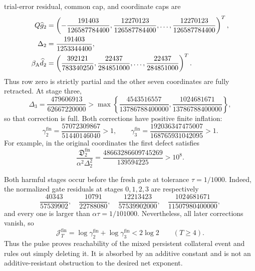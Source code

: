 \begin{proposition}
trial-error residual, common cap, and coordinate caps are
\begin{align}
 Q\widehat g_2
 &=\left(-\frac{191403}{126587784400},
          \frac{12270123}{126587784400},\ldots,
          \frac{12270123}{126587784400}\right)^T,
 \notag\\
 \Delta_2&=\frac{191403}{1253344400},
 \notag\\
 \beta_{\mathrm A}\widehat d_2
 &=\left(\frac{392121}{783340250},
          \frac{22437}{284851000},\ldots,
          \frac{22437}{284851000}\right)^T.
 \label{eq:aesp-cd-k8-reachable-partial-data}
\end{align}
Thus row zero is strictly partial and the other seven coordinates are fully
retracted.  At stage three,
\begin{equation}
 \Delta_3=\frac{479606913}{62667220000}
 >\max\left\{
   \frac{4543516557}{13786788400000},
   \frac{1024681671}{13786788400000}\right\},
 \label{eq:aesp-cd-k8-reachable-full-data}
\end{equation}
so that correction is full.  Both corrections have positive finite
inflation:
\begin{equation}
 \gamma_2^{\mathrm{fin}}
 =\frac{57072309867}{51440146040}>1,
 \qquad
 \gamma_3^{\mathrm{fin}}
 =\frac{192036347475007}{168765931042095}>1.
 \label{eq:aesp-cd-k8-reachable-gammas}
\end{equation}
For example, in the original coordinates the first defect satisfies
\begin{equation}
 \frac{\mathfrak D_2^{\mathrm{fin}}}
      {\alpha^2\Delta_2^2}
 =\frac{48663286609745269}{139594225}>10^8.
 \label{eq:aesp-cd-k8-reachable-bank-ratio}
\end{equation}

Both harmful stages occur before the fresh gate at tolerance
$\tau=1/1000$.  Indeed, the normalized gate residuals at stages
$0,1,2,3$ are respectively
\begin{equation}
 \frac{40343}{57539902},\quad
 \frac{10791}{22788080},\quad
 \frac{12213423}{57539902000},\quad
 \frac{1024681671}{11507980400000},
 \label{eq:aesp-cd-k8-reachable-pre-gate}
\end{equation}
and every one is larger than $\alpha\tau=1/101000$.
Nevertheless, all later corrections vanish, so
\begin{equation*}
 \mathcal J_T^{\mathrm{fin}}
 =\log\gamma_2^{\mathrm{fin}}+\log\gamma_3^{\mathrm{fin}}
 <2\log2
 \qquad(T\geq4).
\end{equation*}
Thus the pulse proves reachability of the mixed persistent collateral event
and rules out simply deleting it.  It is absorbed by an additive constant
and is not an additive-resistant obstruction to the desired net exponent.
\end{proposition}

